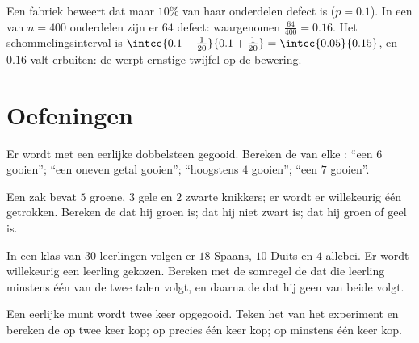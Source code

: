 \begin{example}\label{ex:g10:proba:test}
Een fabriek beweert dat maar $10\%$ van haar onderdelen defect is
($p = 0.1$). In een  van $n = 400$ onderdelen zijn er $64$ defect:
waargenomen  $\frac{64}{400} = 0.16$. Het schommelingsinterval is
$\intcc{0.1 - \frac{1}{20}}{0.1 + \frac{1}{20}} = \intcc{0.05}{0.15}$, en
$0.16$ valt erbuiten: de  werpt ernstige twijfel op de bewering.
\end{example}

\section{Oefeningen}

\begin{exercise}[$\star$]\label{exo:g10:proba:1}
Er wordt met een eerlijke dobbelsteen gegooid. Bereken de  van elke
: ``een $6$ gooien''; ``een oneven getal gooien''; ``hoogstens $4$
gooien''; ``een $7$ gooien''.
\end{exercise}

\begin{exercise}[$\star$]\label{exo:g10:proba:2}
Een zak bevat $5$ groene, $3$ gele en $2$ zwarte knikkers; er wordt er
willekeurig één getrokken. Bereken de  dat hij groen is; dat hij niet
zwart is; dat hij groen of geel is.
\end{exercise}

\begin{exercise}[$\star$]\label{exo:g10:proba:3}
In een klas van $30$ leerlingen volgen er $18$ Spaans, $10$ Duits en $4$
allebei. Er wordt willekeurig een leerling gekozen. Bereken met de somregel
de  dat die leerling minstens één van de twee talen volgt, en daarna de
 dat hij geen van beide volgt.
\end{exercise}

\begin{exercise}[$\star$]\label{exo:g10:proba:4}
Een eerlijke munt wordt twee keer opgegooid. Teken het  van het
experiment en bereken de  op twee keer kop; op precies één keer kop; op
minstens één keer kop.
\end{exercise}

